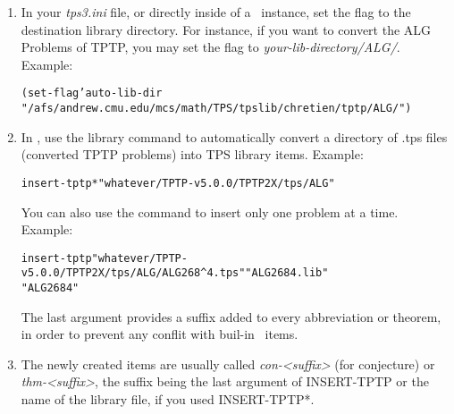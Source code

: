 \begin{enumerate}
\item In your {\it tps3.ini} file, or directly inside of a \TPS~instance, set the flag
 to the destination library directory. For instance, if you want
to convert the ALG Problems of TPTP, you may set the flag to
{\it your-lib-directory/ALG/}.\\
Example:
\begin{alltt}
(set-flag 'auto-lib-dir
"/afs/andrew.cmu.edu/mcs/math/TPS/tpslib/chretien/tptp/ALG/")
\end{alltt}
\item In \TPS , use the library command  to automatically convert a
directory of .tps files (converted TPTP problems) into TPS library
items. Example:
\begin{alltt}
insert-tptp* "whatever/TPTP-v5.0.0/TPTP2X/tps/ALG"
\end{alltt}
You can also use the  command to insert only one problem at a
time. Example:
\begin{alltt}
insert-tptp "whatever/TPTP-v5.0.0/TPTP2X/tps/ALG/ALG268\textasciicircum 4.tps" "ALG2684.lib"
"ALG2684"
\end{alltt}
The last argument provides a suffix added to every abbreviation or theorem, in
order to prevent any conflit with buil-in \TPS~items.

\item The newly created items are usually called {\it con-<suffix>} (for conjecture)
or {\it thm-<suffix>}, the suffix being the last argument of INSERT-TPTP or the
name of the library file, if you used INSERT-TPTP*.
\end{enumerate}
